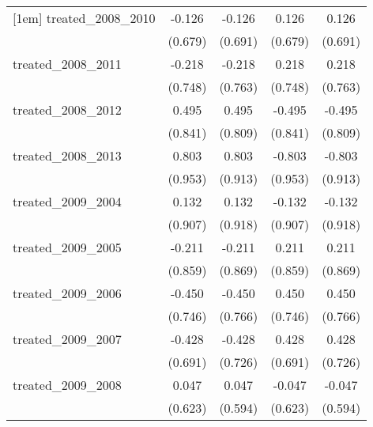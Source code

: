 {\begin{tabular}{l*{4}{c}}
[1em]
treated\_2008\_2010&      -0.126         &      -0.126         &       0.126         &       0.126         \\
            &     (0.679)         &     (0.691)         &     (0.679)         &     (0.691)         \\
[1em]
treated\_2008\_2011&      -0.218         &      -0.218         &       0.218         &       0.218         \\
            &     (0.748)         &     (0.763)         &     (0.748)         &     (0.763)         \\
[1em]
treated\_2008\_2012&       0.495         &       0.495         &      -0.495         &      -0.495         \\
            &     (0.841)         &     (0.809)         &     (0.841)         &     (0.809)         \\
[1em]
treated\_2008\_2013&       0.803         &       0.803         &      -0.803         &      -0.803         \\
            &     (0.953)         &     (0.913)         &     (0.953)         &     (0.913)         \\
[1em]
treated\_2009\_2004&       0.132         &       0.132         &      -0.132         &      -0.132         \\
            &     (0.907)         &     (0.918)         &     (0.907)         &     (0.918)         \\
[1em]
treated\_2009\_2005&      -0.211         &      -0.211         &       0.211         &       0.211         \\
            &     (0.859)         &     (0.869)         &     (0.859)         &     (0.869)         \\
[1em]
treated\_2009\_2006&      -0.450         &      -0.450         &       0.450         &       0.450         \\
            &     (0.746)         &     (0.766)         &     (0.746)         &     (0.766)         \\
[1em]
treated\_2009\_2007&      -0.428         &      -0.428         &       0.428         &       0.428         \\
            &     (0.691)         &     (0.726)         &     (0.691)         &     (0.726)         \\
[1em]
treated\_2009\_2008&       0.047         &       0.047         &      -0.047         &      -0.047         \\
            &     (0.623)         &     (0.594)         &     (0.623)         &     (0.594)         \\

\end{tabular}}

